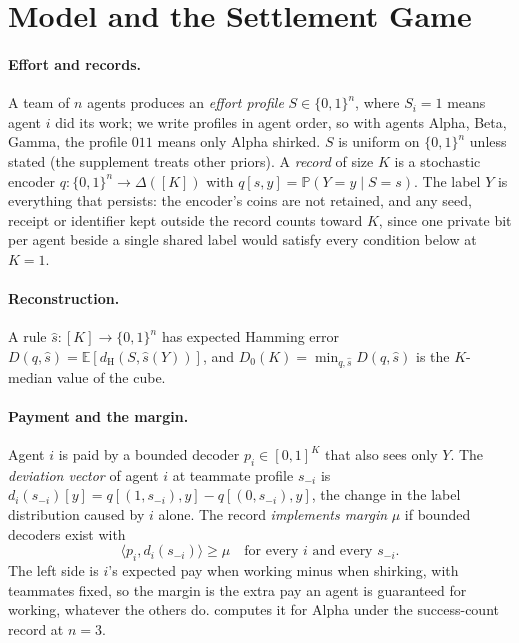 \documentclass[sigconf,anonymous,acmthm=false]{aamas}
\theoremstyle{acmplain}
\theoremstyle{acmdefinition}
\newcommand{\E}{\mathbb{E}}
\newcommand{\Pb}{\mathbb{P}}
\newcommand{\dH}{d_{\mathrm{H}}}
\newcommand{\shat}{\hat{s}}
\newcommand{\cube}{\{0,1\}}
\newcommand{\A}{\textsf{Alpha}}
\newcommand{\B}{\textsf{Beta}}
\newcommand{\G}{\textsf{Gamma}}
\begin{document}
\section{Model and the Settlement Game}\label{sec:model}

\paragraph{Effort and records.} A team of $n$ agents produces an \emph{effort profile}
$S\in\cube^n$, where $S_i=1$ means agent $i$ did its work; we write profiles in agent order,
so with agents \A, \B, \G, the profile $011$ means only \A{} shirked. $S$ is uniform on
$\cube^n$ unless stated (the supplement treats other priors). A \emph{record} of size $K$
is a stochastic encoder $q:\cube^n\to\Delta([K])$ with $q[s,y]=\Pb(Y=y\mid S=s)$. The label
$Y$ is everything that persists: the encoder's coins are not retained, and any seed, receipt
or identifier kept outside the record counts toward $K$, since one private bit per agent
beside a single shared label would satisfy every condition below at $K=1$.

\paragraph{Reconstruction.} A rule $\shat:[K]\to\cube^n$ has expected Hamming error
$D(q,\shat)=\E[\dH(S,\shat(Y))]$, and $D_0(K)=\min_{q,\shat}D(q,\shat)$ is the $K$-median
value of the cube.

\paragraph{Payment and the margin.} Agent $i$ is paid by a bounded decoder $p_i\in[0,1]^K$
that also sees only $Y$. The \emph{deviation vector} of agent $i$ at teammate profile
$s_{-i}$ is $d_i(s_{-i})[y]=q[(1,s_{-i}),y]-q[(0,s_{-i}),y]$, the change in the label
distribution caused by $i$ alone. The record \emph{implements margin} $\mu$ if bounded
decoders exist with
\begin{equation}\label{eq:M}\tag{M}
\langle p_i,d_i(s_{-i})\rangle\ge\mu\quad\text{for every } i \text{ and every } s_{-i}.
\end{equation}
The left side is $i$'s expected pay when working minus when shirking, with teammates fixed,
so the margin is the extra pay an agent is guaranteed for working, whatever the others do.
 computes it for \A{} under the success-count record at $n=3$.
\end{document}
